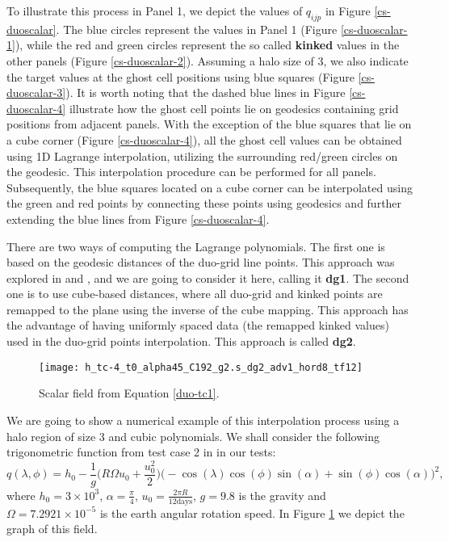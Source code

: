 To illustrate this process in Panel 1, we depict the values of $q_{ijp}$ in Figure \ref{cs-duoscalar}. 
The blue circles represent the values in Panel 1 (Figure \ref{cs-duoscalar-1}), while the red and green circles 
represent the so called \textbf{kinked} values in the other panels (Figure \ref{cs-duoscalar-2}). 
Assuming a halo size of 3, we also indicate the target values at the ghost cell 
positions using blue squares (Figure \ref{cs-duoscalar-3}). 
It is worth noting that the dashed blue lines in Figure \ref{cs-duoscalar-4} 
illustrate how the ghost cell points lie on geodesics containing grid positions from adjacent panels.
With the exception of the blue squares that lie on a cube corner (Figure \ref{cs-duoscalar-4}),
all the ghost cell values can be obtained using 1D Lagrange interpolation, 
utilizing the surrounding red/green circles on the geodesic. 
This interpolation procedure can be performed for all panels. 
Subsequently, the blue squares located on a cube corner can be interpolated using the 
green and red points by connecting these points using geodesics and further extending the blue lines from Figure \ref{cs-duoscalar-4}.

There are two ways of computing the Lagrange polynomials.
The first one is based on the geodesic distances of the duo-grid line points.
This approach was explored in \citet{chen:2021} and \citet{mouallem:2023}, and we are going to consider it here, calling it \textbf{dg1}.
The second one is to use cube-based distances, where all duo-grid and kinked points are remapped to the plane using the inverse of the cube mapping. 
This approach has the advantage of having uniformly spaced data (the remapped kinked values) used in the duo-grid points interpolation.
This approach is called \textbf{dg2}.
\begin{figure}[!htb]
	\centering
	\texttt{[image: h\_tc-4\_t0\_alpha45\_C192\_g2.s\_dg2\_adv1\_hord8\_tf12]}
	\caption{Scalar field from Equation \eqref{duo-tc1}.\label{cs-duo-tc1}}
\end{figure}

We are going to show a numerical example of this interpolation process using a halo region of size 3 and cubic polynomials.
We shall consider the following trigonometric function
from test case 2 in \citet{will:1992} in our tests:
\begin{equation}
\label{duo-tc1}
q(\lambda, \phi) = h_0 - \frac{1}{g}\bigg(R\Omega u_0 + \frac{u_0^2}{2}\bigg)
\bigg( -\cos(\lambda)\cos(\phi)\sin(\alpha) + \sin(\phi)\cos(\alpha) \bigg)^2,
\end{equation}
where $h_0 = 3\times 10^3 $,
$\alpha=\frac{\pi}{4}$, $u_0 = \frac{2\pi R}{12 \text{days}}$,  $g=9.8$ is the gravity and $\Omega=7.2921 \times 10^{-5}$ is the earth angular rotation speed.
In Figure \ref{cs-duo-tc1} we depict the graph of this field.

